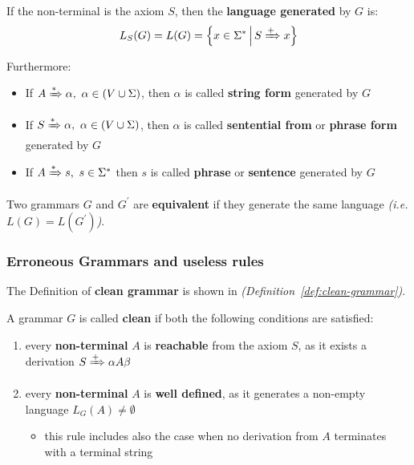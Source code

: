 \documentclass[english]{article}
\begin{document}
If the non-terminal is the axiom \(S\), then the \textbf{language generated} by \(G\) is:
\[ L_S(G) = L(G) = \left\{x \in \Sigma^\ast \, \middle| \, S \xRightarrow{+} x \right\} \]

\bigskip
Furthermore:

\begin{itemize}
  \item If \(A \xRightarrow{\ast} \alpha, \ \alpha \in (V \cup \Sigma)\), then \(\alpha\) is called \textbf{string form} generated by \(G\)
  \item If \(S \xRightarrow{\ast} \alpha, \ \alpha \in (V \cup \Sigma)\), then \(\alpha\) is called \textbf{sentential from} or \textbf{phrase form} generated by \(G\)
  \item If \(A \xRightarrow{\ast} s, \ s \in \Sigma^\ast\) then \(s\) is called \textbf{phrase} or \textbf{sentence} generated by \(G\)
\end{itemize}

\begin{property}
  Two grammars \(G\) and \(G^\prime\) are \textbf{equivalent} if they generate the same language \textit{(i.e. \(L(G) = L(G^\prime)\))}.
\end{property}

\subsubsection{Erroneous Grammars and useless rules}

The Definition of \textbf{clean grammar} is shown in \textit{(Definition~\ref{def:clean-grammar})}.

\begin{definition}
  \label{def:clean-grammar}
  A grammar \(G\) is called \textbf{clean} if both the following conditions are satisfied:

  \begin{enumerate}
    \item every \textbf{non-terminal} \(A\) is \textbf{reachable} from the axiom \(S\), as it exists a derivation \(S \xRightarrow{+} \alpha A \beta\)
    \item every \textbf{non-terminal} \(A\) is \textbf{well defined}, as it generates a non-empty language \(L_G(A) \neq \emptyset\)
          \begin{itemize}[label=\(\rightarrow\)]
            \item this rule includes also the case when no derivation from \(A\) terminates with a terminal string
          \end{itemize}
  \end{enumerate}
\end{definition}
\end{document}
